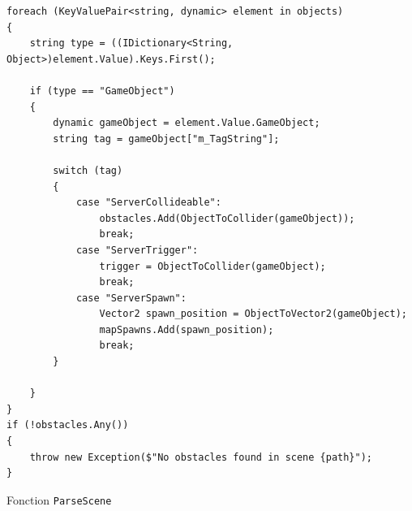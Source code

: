\documentclass[a4paper]{article}
\begin{document}
\begin{listing}[H]
\begin{verbatim}
foreach (KeyValuePair<string, dynamic> element in objects)
{
    string type = ((IDictionary<String, Object>)element.Value).Keys.First();

    if (type == "GameObject")
    {
        dynamic gameObject = element.Value.GameObject;
        string tag = gameObject["m_TagString"];

        switch (tag)
        {
            case "ServerCollideable":
                obstacles.Add(ObjectToCollider(gameObject));
                break;
            case "ServerTrigger":
                trigger = ObjectToCollider(gameObject);
                break;
            case "ServerSpawn":
                Vector2 spawn_position = ObjectToVector2(gameObject);                            
                mapSpawns.Add(spawn_position);
                break;
        }

    }
}
if (!obstacles.Any())
{
    throw new Exception($"No obstacles found in scene {path}");
}
\end{verbatim}
\caption{Fonction \texttt{ParseScene}}
\label{extrait:parsescene}
\end{listing}
\end{document}
